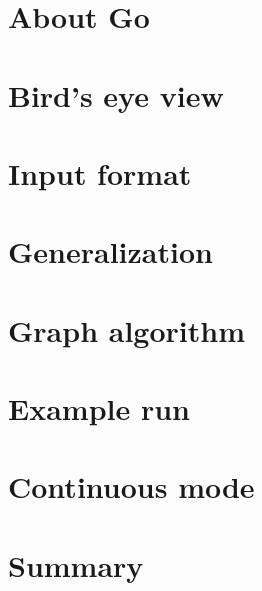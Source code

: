 \section{About Go}\label{sec:about-go}


\section{Bird's eye view}\label{sec:bird's-eye-view}


\section{Input format}\label{sec:input-format}


\section{Generalization}\label{sec:generalization}


\section{Graph algorithm}\label{sec:graph_algorithm_implementation}


\section{Example run}\label{sec:example_run}


\section{Continuous mode}\label{sec:continuous_mode}


\section{Summary}\label{sec:chapter03_summary}
